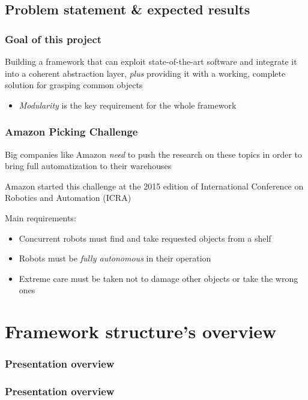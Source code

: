 \documentclass{beamer}
\begin{document}
  \subsection{Problem statement \& expected results}
  \begin{frame}
    \frametitle{Goal of this project}
    Building a framework that can exploit state-of-the-art software
    and integrate it into a coherent abstraction layer, \emph{plus}
    providing it with a working, complete
    solution for grasping common objects
    \begin{itemize}
      \item{\emph{Modularity} is the key requirement for the whole framework}
    \end{itemize}
  \end{frame}

  \begin{frame}
    \frametitle{Amazon Picking Challenge}
    Big companies like Amazon \emph{need} to push the research on
    these topics in order to bring full automatization to their
    warehouses

    Amazon started this challenge at the 2015 edition of International
    Conference on Robotics and Automation (ICRA)

    Main requirements:
    \begin{itemize}
    \item{Concurrent robots must find and take requested objects from a shelf}
    \item{Robots must be \emph{fully autonomous} in their operation}
    \item{Extreme care must be taken not to damage other objects or
      take the wrong ones}
    \end{itemize}
  \end{frame}

  \section{Framework structure's overview}
  \begin{frame}
    \frametitle{Presentation overview}
    \tableofcontents
  \end{frame}
  \begin{frame}
    \frametitle{Presentation overview}
    \tableofcontents[currentsection]
  \end{frame}
\end{document}
